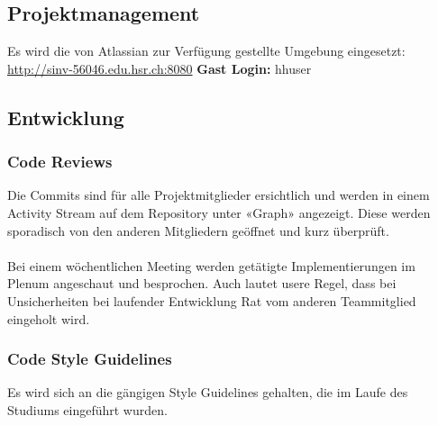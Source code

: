 \subsection*{Projektmanagement}
Es wird die von Atlassian zur Verfügung gestellte Umgebung eingesetzt: \\
\url{http://sinv-56046.edu.hsr.ch:8080}
\textbf{Gast Login:} hhuser


\subsection*{Entwicklung}
\subsubsection*{Code Reviews}
Die Commits sind für alle Projektmitglieder ersichtlich und werden in einem Activity Stream auf dem Repository unter «Graph» angezeigt. Diese werden sporadisch von den anderen Mitgliedern geöffnet und kurz überprüft. \\
\\
Bei einem wöchentlichen Meeting werden getätigte Implementierungen im Plenum angeschaut und besprochen. Auch lautet usere Regel, dass bei Unsicherheiten bei laufender Entwicklung Rat vom anderen Teammitglied eingeholt wird.

\subsubsection*{Code Style Guidelines}
Es wird sich an die gängigen Style Guidelines gehalten, die im Laufe des Studiums eingeführt wurden.